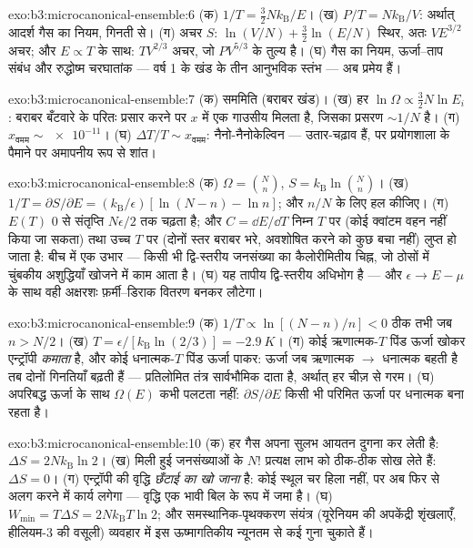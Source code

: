 \begin{solution}{exo:b3:microcanonical-ensemble:6}
(क) $1/T = \tfrac32 Nk_{\text{B}}/E$। (ख) $P/T =
Nk_{\text{B}}/V$: अर्थात् आदर्श गैस का नियम, गिनती से। (ग) अचर
$S$: $\ln(V/N) + \tfrac32\ln(E/N)$ स्थिर, अतः $VE^{3/2}$ अचर;
और $E \propto T$ के साथ: $TV^{2/3}$ अचर, जो
$PV^{5/3}$ के तुल्य है। (घ) गैस का नियम, ऊर्जा--ताप संबंध और
रुद्धोष्म चरघातांक --- वर्ष 1 के खंड के तीन आनुभविक स्तंभ --- अब
प्रमेय हैं।
\end{solution}

\begin{solution}{exo:b3:microcanonical-ensemble:7}
(क) सममिति (बराबर खंड)। (ख) हर $\ln\Omega \propto
\tfrac32 N\ln E_i$: बराबर बँटवारे के परितः प्रसार करने पर
$x$ में एक गाउसीय मिलता है, जिसका प्रसरण $\sim1/N$ है। (ग) $x_{\text{वमम}} \sim
\num{e-11}$। (घ) $\Delta T/T \sim x_{\text{वमम}}$:
नैनो-नैनोकेल्विन --- उतार-चढ़ाव हैं, पर प्रयोगशाला के पैमाने पर
अमापनीय रूप से शांत।
\end{solution}

\begin{solution}{exo:b3:microcanonical-ensemble:8}
(क) $\Omega = \binom Nn$, $S = k_{\text{B}}\ln\binom Nn$। (ख)
$1/T = \partial S/\partial E = (k_{\text{B}}/\epsilon)[\ln(N-n) -
\ln n]$; और $n/N$ के लिए हल कीजिए। (ग) $E(T)$ $0$ से संतृप्ति
$N\epsilon/2$ तक चढ़ता है; और $C = \dd E/\dd T$ निम्न $T$ पर
(कोई क्वांटम वहन नहीं किया जा सकता) तथा उच्च $T$ पर (दोनों स्तर
बराबर भरे, अवशोषित करने को कुछ बचा नहीं) लुप्त हो जाता है: बीच में एक
उभार --- किसी भी द्वि-स्तरीय जनसंख्या का कैलोरीमितीय चिह्न, जो
ठोसों में चुंबकीय अशुद्धियाँ खोजने में काम आता है। (घ) यह तापीय
द्वि-स्तरीय अधिभोग है --- और $\epsilon \to E - \mu$ के साथ वही
अक्षरशः फ़र्मी--डिराक वितरण बनकर लौटेगा।
\end{solution}

\begin{solution}{exo:b3:microcanonical-ensemble:9}
(क) $1/T \propto \ln[(N-n)/n] < 0$ ठीक तभी जब $n > N/2$। (ख)
$T = \epsilon/[k_{\text{B}}\ln(2/3)] = -\qty{2.9}{K}$। (ग) कोई
ऋणात्मक-$T$ पिंड ऊर्जा खोकर एन्ट्रॉपी \emph{कमाता} है, और कोई
धनात्मक-$T$ पिंड ऊर्जा पाकर: ऊर्जा जब ऋणात्मक $\to$ धनात्मक बहती
है तब दोनों गिनतियाँ बढ़ती हैं --- प्रतिलोमित तंत्र
सार्वभौमिक दाता है, अर्थात् हर चीज़ से गरम। (घ) अपरिबद्ध
ऊर्जा के साथ $\Omega(E)$ कभी पलटता नहीं: $\partial S/\partial E$
किसी भी परिमित ऊर्जा पर धनात्मक बना रहता है।
\end{solution}

\begin{solution}{exo:b3:microcanonical-ensemble:10}
(क) हर गैस अपना सुलभ आयतन दुगना कर लेती है: $\Delta S =
2Nk_{\text{B}}\ln2$। (ख) मिली हुई जनसंख्याओं के $N!$
प्रत्यक्ष लाभ को ठीक-ठीक सोख लेते हैं: $\Delta S = 0$। (ग) एन्ट्रॉपी
की वृद्धि \emph{छँटाई का खो जाना} है: कोई स्थूल चर हिला नहीं, पर अब
फिर से अलग करने में कार्य लगेगा --- वृद्धि एक भावी बिल के रूप में
जमा है। (घ) $W_{\min} = T\Delta S =
2Nk_{\text{B}}T\ln2$; और समस्थानिक-पृथक्करण संयंत्र (यूरेनियम की
अपकेंद्री शृंखलाएँ, हीलियम-3 की वसूली) व्यवहार में इस ऊष्मागतिकीय
न्यूनतम से कई गुना चुकाते हैं।
\end{solution}

